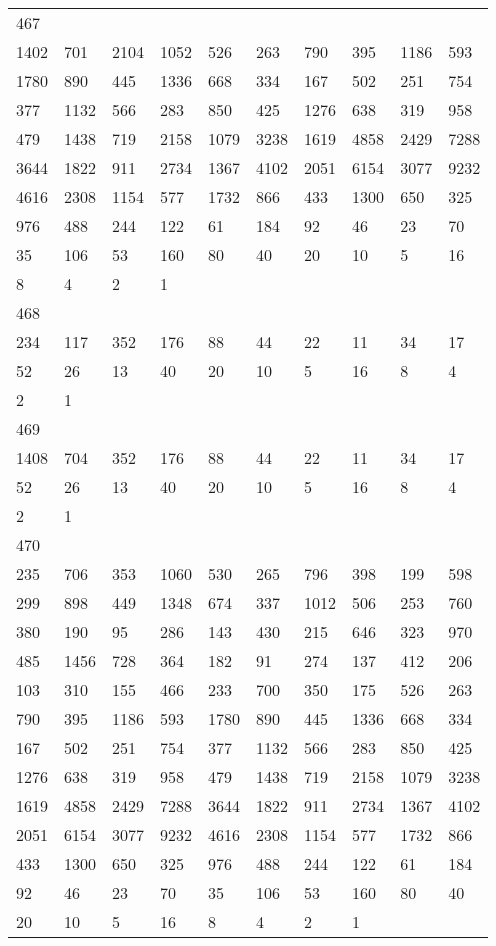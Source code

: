 \begin{longtable}{*{10}{l}}
467&&&&&&&&&\\
1402& 701& 2104& 1052& 526& 263& 790& 395& 1186& 593\\
1780& 890& 445& 1336& 668& 334& 167& 502& 251& 754\\
377& 1132& 566& 283& 850& 425& 1276& 638& 319& 958\\
479& 1438& 719& 2158& 1079& 3238& 1619& 4858& 2429& 7288\\
3644& 1822& 911& 2734& 1367& 4102& 2051& 6154& 3077& 9232\\
4616& 2308& 1154& 577& 1732& 866& 433& 1300& 650& 325\\
976& 488& 244& 122& 61& 184& 92& 46& 23& 70\\
35& 106& 53& 160& 80& 40& 20& 10& 5& 16\\
8& 4& 2& 1& \\

468&&&&&&&&&\\
234& 117& 352& 176& 88& 44& 22& 11& 34& 17\\
52& 26& 13& 40& 20& 10& 5& 16& 8& 4\\
2& 1& \\

469&&&&&&&&&\\
1408& 704& 352& 176& 88& 44& 22& 11& 34& 17\\
52& 26& 13& 40& 20& 10& 5& 16& 8& 4\\
2& 1& \\

470&&&&&&&&&\\
235& 706& 353& 1060& 530& 265& 796& 398& 199& 598\\
299& 898& 449& 1348& 674& 337& 1012& 506& 253& 760\\
380& 190& 95& 286& 143& 430& 215& 646& 323& 970\\
485& 1456& 728& 364& 182& 91& 274& 137& 412& 206\\
103& 310& 155& 466& 233& 700& 350& 175& 526& 263\\
790& 395& 1186& 593& 1780& 890& 445& 1336& 668& 334\\
167& 502& 251& 754& 377& 1132& 566& 283& 850& 425\\
1276& 638& 319& 958& 479& 1438& 719& 2158& 1079& 3238\\
1619& 4858& 2429& 7288& 3644& 1822& 911& 2734& 1367& 4102\\
2051& 6154& 3077& 9232& 4616& 2308& 1154& 577& 1732& 866\\
433& 1300& 650& 325& 976& 488& 244& 122& 61& 184\\
92& 46& 23& 70& 35& 106& 53& 160& 80& 40\\
20& 10& 5& 16& 8& 4& 2& 1& \\


\end{longtable}
